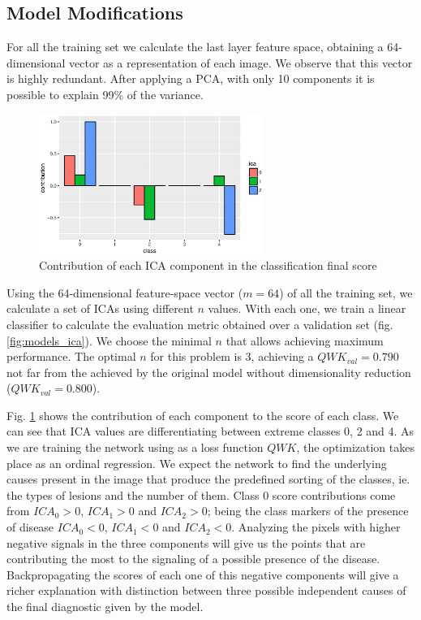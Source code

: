 \documentclass[review]{elsarticle}
\theoremstyle{definition} %
\theoremstyle{remark}
\begin{document}
\subsection{Model Modifications}

For all the training set we calculate the last layer feature space, obtaining a 64-dimensional vector as a representation of each image. We observe that this vector is highly redundant. After applying a PCA, with only 10 components it is possible to explain 99\% of the variance.

\begin{figure}[h]
	\centering	
	\includegraphics[width=0.65\textwidth]{./figures/ica_class_contribution.eps}
	\caption{Contribution of each ICA component in the classification final score}
	\label{fig:ica_contribution}
\end{figure}

Using the 64-dimensional feature-space vector ($m=64$) of all the training set, we calculate a set of ICAs using different $n$ values. With each one, we train a linear classifier to calculate the evaluation metric obtained over a validation set (fig. \ref{fig:models_ica}). We choose the minimal $n$ that allows achieving maximum performance. The optimal $n$ for this problem is $3$, achieving a $QWK_{val} = 0.790$ not far from the achieved by the original model without dimensionality reduction ($QWK_{val} = 0.800$).

Fig. \ref{fig:ica_contribution} shows the contribution of each component to the score of each class. We can see that ICA values are differentiating between extreme classes 0, 2 and 4. As we are training the network using as a loss function $QWK$, the optimization takes place as an ordinal regression. We expect the network to find the underlying causes present in the image that produce the predefined sorting of the classes, ie. the types of lesions and the number of them. Class 0 score contributions come from $ICA_0 > 0$, $ICA_1 > 0$ and $ICA_2 > 0$; being the class markers of the presence of disease $ICA_0 < 0$, $ICA_1 < 0$ and $ICA_2 < 0$. Analyzing the pixels with higher negative signals in the three components will give us the points that are contributing the most to the signaling of a possible presence of the disease. Backpropagating the scores of each one of this negative components will give a richer explanation with distinction between three possible independent causes of the final diagnostic given by the model.
\end{document}
